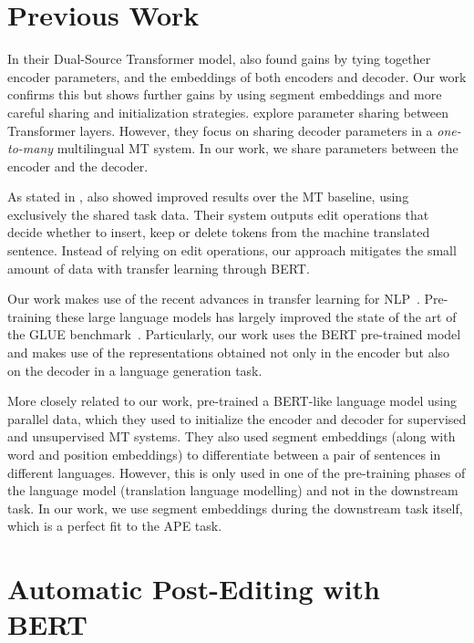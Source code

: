 \section{Previous Work}

In their Dual-Source Transformer model, \citet{junczys2018ms} also
found gains by tying together encoder parameters, and the embeddings
of both encoders and decoder. Our work confirms this but shows
further gains by using segment embeddings and more careful sharing
and initialization strategies. \citet{sachan2018parameter} explore
parameter sharing between Transformer layers. However, they focus on
sharing decoder parameters in a \emph{one-to-many} multilingual MT
system. In our work, we share parameters between the encoder and the
decoder.

As stated in , \citet{berard2017lig} also
showed improved results over the MT baseline, using exclusively the
shared task data. Their system outputs edit operations that decide
whether to insert, keep or delete tokens from the machine translated
sentence. Instead of relying on edit operations, our approach
mitigates the small amount of data with transfer learning through
BERT.

Our work makes use of the recent advances in transfer learning for
NLP~\citep{peters2018deep, howard2018universal, radford2018improving,
  devlin2018bert}. Pre-training these large language models has largely
improved the state of the art of the GLUE
benchmark~\citep{wang2018glue}. Particularly, our work uses the BERT
pre-trained model and makes use of the representations obtained not
only in the encoder but also on the decoder in a language generation
task.

More closely related to our work, \citet{lample2019xlm}
pre-trained a BERT-like language model using parallel data, which
they used to initialize the encoder and decoder for supervised and
unsupervised MT systems. They also used segment embeddings (along
with word and position embeddings) to differentiate between a pair of
sentences in different languages. However, this is only used in one
of the pre-training phases of the language model (translation
language modelling) and not in the downstream task. In our work, we
use segment embeddings during the downstream task itself, which is a
perfect fit to the APE task.

\section{Automatic Post-Editing with BERT}\label{sec:ape_bert}

